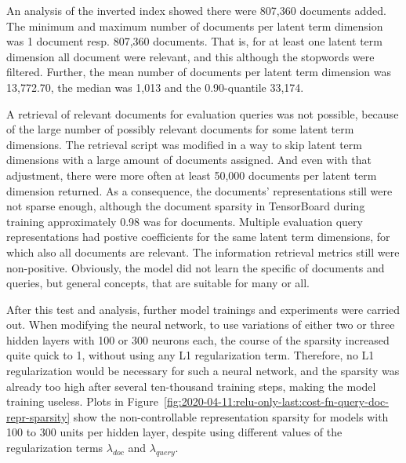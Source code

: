 An analysis of the inverted index showed there were 807,360 documents added.
The minimum and maximum number of documents per latent term dimension was 
    1 document resp. 807,360 documents.
That is, for at least one latent term dimension all document were relevant,
    and this although the stopwords were filtered.
Further, the mean number of documents per latent term dimension was 13,772.70, 
    the median was 1,013 and the 0.90-quantile 33,174.

A retrieval of relevant documents for evaluation queries was not possible,
    because of the large number of possibly relevant documents for some 
    latent term dimensions.
The retrieval script was modified in a way to skip latent term dimensions with
    a large amount of documents assigned.
And even with that adjustment, there were more often at least 50,000 documents per 
    latent term dimension returned.
As a consequence, the documents' representations still were not sparse enough, although 
    the document sparsity in TensorBoard during training approximately 0.98 was for documents.
Multiple evaluation query representations had postive coefficients
    for the same latent term dimensions, for which also all documents are relevant.
The information retrieval metrics still were non-positive.
Obviously, the model did not learn the specific of documents and queries, but general
    concepts, that are suitable for many or all.

After this test and analysis, further model trainings and experiments were carried out.
When modifying the neural network, to use variations of either two or three hidden layers 
    with 100 or 300 neurons each, 
    the course of the sparsity increased quite quick to 1, without using any L1 
    regularization term.
Therefore, no L1 regularization would be necessary for such a neural network,
    and the sparsity was already too high after several ten-thousand training steps,
    making the model training useless.
Plots in Figure~\ref{fig:2020-04-11:relu-only-last:cost-fn-query-doc-repr-sparsity}
    show the non-controllable representation sparsity for models with 100 to 300 units
    per hidden layer, despite using different values of the regularization terms 
    $\lambda_{doc}$ and $\lambda_{query}$.

